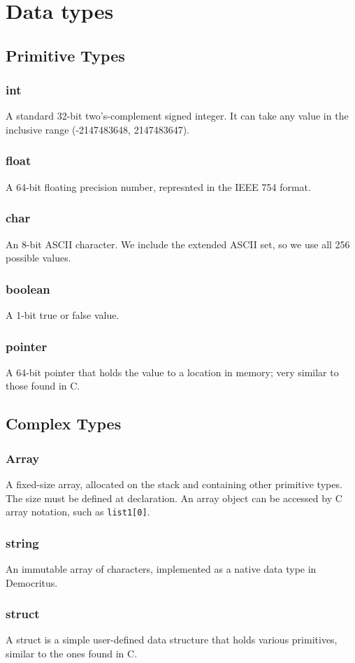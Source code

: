 \chapter{Data types}
    \section{Primitive Types}
        \subsection{int}
            A standard 32-bit two's-complement signed integer. It can take any value in the inclusive range (-2147483648, 2147483647).
        \subsection{float}
            A 64-bit floating precision number, represnted in the IEEE 754 format.            
        \subsection{char}
            An 8-bit ASCII character. We include the extended ASCII set, so we use all 256 possible values.
        \subsection{boolean}
            A 1-bit true or false value.
        \subsection{pointer}
            A 64-bit pointer that holds the value to a location in memory; very similar to those found in C.
    \section{Complex Types}
        \subsection{Array}
            A fixed-size array, allocated on the stack and containing other primitive types. The size must be defined at declaration. An array object can be accessed by C array notation, such as \texttt{list1[0]}.
        \subsection{string}
                An immutable array of characters, implemented as a native data type in Democritus.
       \subsection{struct}
            A struct is a simple user-defined data structure that holds various primitives, similar to the ones found in C. 

